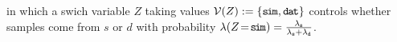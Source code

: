 \documentclass[twoside]{article}
\theoremstyle{plain}
\theoremstyle{definition}
\newcommand{\V}{\mathcal V}
\newcommand{\dg}[1]{\mathbdcal{#1}}
\begin{document}
in which a swich variable $Z$ 
taking values $\V(Z) := \{\simsymb,\datsymb\}$
controls whether samples come from $s$ or $d$
with probability $\lambda(Z\!=\!\texttt{s\kern-1.1pti\kern-0.8ptm}) = \frac{\lambda_{\texttt{s}}}{\lambda_{\texttt{s}} + \lambda_{\texttt{d}}}$.
\end{document}
